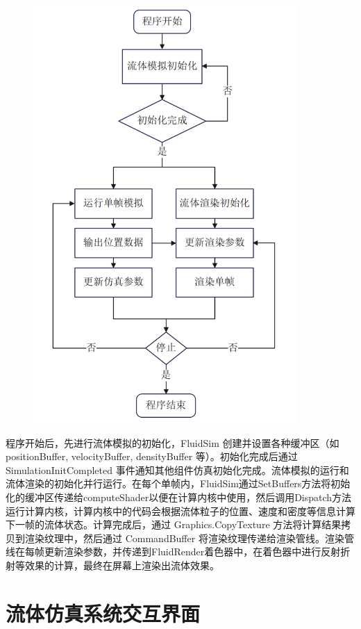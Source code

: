 \begin{figure}[ht]
    \centering
    \includegraphics[width=10cm]{image/pipeline4.png}
    \label{fig:pipeline4}
\end{figure}
程序开始后，先进行流体模拟的初始化，FluidSim 创建并设置各种缓冲区（如 positionBuffer, velocityBuffer, densityBuffer 等）。初始化完成后通过 SimulationInitCompleted 事件通知其他组件仿真初始化完成。流体模拟的运行和流体渲染的初始化并行运行。在每个单帧内，FluidSim通过SetBuffers方法将初始化的缓冲区传递给computeShader以便在计算内核中使用，然后调用Dispatch方法运行计算内核，计算内核中的代码会根据流体粒子的位置、速度和密度等信息计算下一帧的流体状态。计算完成后，通过 Graphics.CopyTexture 方法将计算结果拷贝到渲染纹理中，然后通过 CommandBuffer 将渲染纹理传递给渲染管线。渲染管线在每帧更新渲染参数，并传递到FluidRender着色器中，在着色器中进行反射折射等效果的计算，最终在屏幕上渲染出流体效果。


\section{流体仿真系统交互界面}

